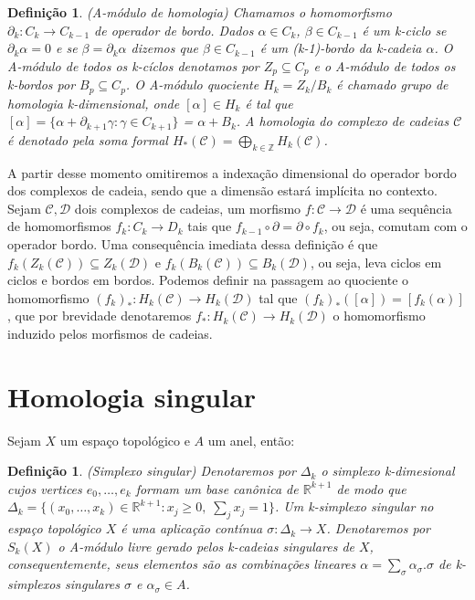 \documentclass[twoside,openright,titlepage,numbers=noenddot,headinclude,  lineheaders footinclude=true,cleardoublepage=empty,
                                BCOR=5mm,paper=a4,fontsize=12pt ]{scrbook}
\newtheorem{defn}[teo]{Definição}
\newcommand{\real}[1]{\mathbb{R}^{#1}}
\begin{document}
\begin{defn}
	(A-módulo de homologia) Chamamos o homomorfismo $\partial_{k}: C_{k} \to C_{k-1} $ de operador de bordo. Dados $\alpha \in C_{k}$, $\beta \in C_{k-1}$  é um k-ciclo se $\partial_{k }\alpha=0$ e se $\beta =  \partial_{k }\alpha$ dizemos que $\beta \in C_{k-1}$ é um (k-1)-bordo da k-cadeia $\alpha$. O A-módulo de todos os k-cíclos denotamos por $Z_{p} \subseteq C_{p}$ e o  A-módulo de todos os k-bordos por $B_{p} \subseteq C_{p}$. O A-módulo quociente $H_{k} = Z_{k} / B_{k}$ é chamado grupo de homologia k-dimensional, onde $[\alpha] \in H_{k}$ é tal que $[\alpha] = \{\alpha+\partial_{k+1}\gamma :\gamma \in  C_{k+1}\}$ = $\alpha + B_{k}$. A homologia do complexo de cadeias $\mathcal{C}$ é denotado pela soma formal $H_{*}(\mathcal{C}) = \bigoplus_{k \in \mathbb{Z}} H_{k}(\mathcal{C})$.
\end{defn}

A partir desse momento omitiremos a indexação dimensional do operador bordo dos complexos de cadeia, sendo que a dimensão estará implícita no contexto. Sejam $\mathcal{C}, \mathcal{D}$ dois complexos de cadeias, um morfismo $f: \mathcal{C} \to \mathcal{D}$ é uma sequência de homomorfismos $f_{k}: C_{k} \to D_{k}$ tais que $f_{k-1}\circ\partial = \partial\circ f_{k}$, ou seja, comutam com o operador bordo. Uma consequência imediata dessa definição é que $f_{k}(Z_{k}(\mathcal{C})) \subseteq Z_{k}(\mathcal{D})$ e $f_{k}(B_{k}(\mathcal{C})) \subseteq B_{k}(\mathcal{D})$, ou seja, leva ciclos em ciclos e bordos em bordos. Podemos definir na passagem ao quociente o homomorfismo $(f_{k})_{*}:H_{k}(\mathcal{C}) \to H_{k}(\mathcal{D})$ tal que $(f_{k})_{*}([\alpha]) = [f_{k}(\alpha)]$, que por brevidade denotaremos $f_{*}:H_{k}(\mathcal{C}) \to H_{k}(\mathcal{D})$ o homomorfismo induzido pelos morfismos de cadeias.
\section{Homologia singular}
Sejam $X$ um espaço topológico e $A$ um anel, então:
\begin{defn}
	(Simplexo singular) Denotaremos por $\Delta_{k}$ o simplexo k-dimesional cujos vertices $e_{0}, \dots, e_{k}$ formam um base canônica de $\real{k+1}$ de modo que $\Delta_{k} = \{(x_{0}, \dots, x_{k}) \in \real{k+1}: x_{j}\geq 0, \;\sum_{j}x_{j}=1\}$. Um k-simplexo singular no espaço topológico $X$ é uma aplicação contínua $\sigma:\Delta_{k} \to X$. Denotaremos por $S_{k}(X)$ o A-módulo livre gerado pelos k-cadeias singulares de $X$, consequentemente, seus elementos são as combinações lineares $\alpha = \sum_{\sigma} \alpha_{\sigma}.\sigma $ de k-simplexos singulares $\sigma$ e $\alpha_{\sigma} \in A$.
\end{defn}
\end{document}
